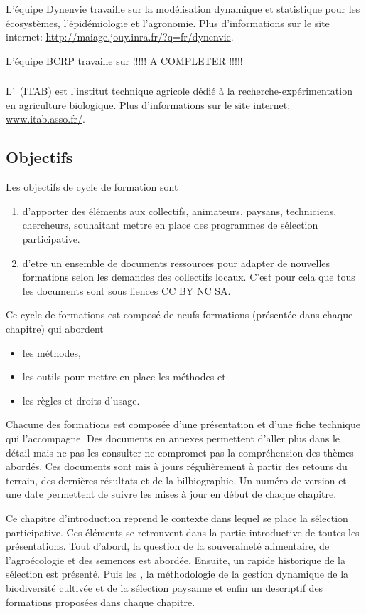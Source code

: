 L'équipe Dynenvie travaille sur la modélisation dynamique et statistique pour les écosystèmes, l'épidémiologie et l'agronomie.
Plus d'informations sur le site internet: \url{http://maiage.jouy.inra.fr/?q=fr/dynenvie}.

L'équipe BCRP travaille sur !!!!! A COMPLETER !!!!!

\subsubsection{\ITAB}
L'\ITAB~(ITAB) est l'institut technique agricole dédié à la recherche-expérimentation en agriculture biologique.
Plus d'informations sur le site internet: \url{www.itab.asso.fr/}.


\subsection{Objectifs}
Les objectifs de cycle de formation sont

\begin{enumerate}
\item d'apporter des éléments aux collectifs, animateurs, paysans, techniciens, chercheurs, souhaitant mettre en place des programmes de sélection participative.
\item d'etre un ensemble de documents ressources pour adapter de nouvelles formations selon les demandes des collectifs locaux. C'est pour cela que tous les documents sont sous liences CC BY NC SA.
\end{enumerate}

Ce cycle de formations est composé de neufs formations (présentée dans chaque chapitre) qui abordent 
\begin{itemize}
\item les méthodes,
\item les outils pour mettre en place les méthodes et 
\item les règles et droits d’usage.
\end{itemize}

Chacune des formations est composée d’une présentation et d’une fiche technique qui l’accompagne. 
Des documents en annexes permettent d’aller plus dans le détail mais ne pas les consulter ne
compromet pas la compréhension des thèmes abordés. 
Ces documents sont mis à jours régulièrement à partir des retours du terrain, des dernières résultats et de la bilbiographie. 
Un numéro de version et une date permettent de suivre les mises à jour en début de chaque chapitre.

Ce chapitre d'introduction reprend le contexte dans lequel se place la sélection participative.
Ces éléments se retrouvent dans la partie introductive de toutes les présentations.
Tout d'abord, la question de la souveraineté alimentaire, de l'agroécologie et des semences est abordée.
Ensuite, un rapide historique de la sélection est présenté.
Puis les \MSPs, 
la méthodologie de la gestion dynamique de la biodiversité cultivée et de la sélection paysanne et enfin
un descriptif des formations proposées dans chaque chapitre.

